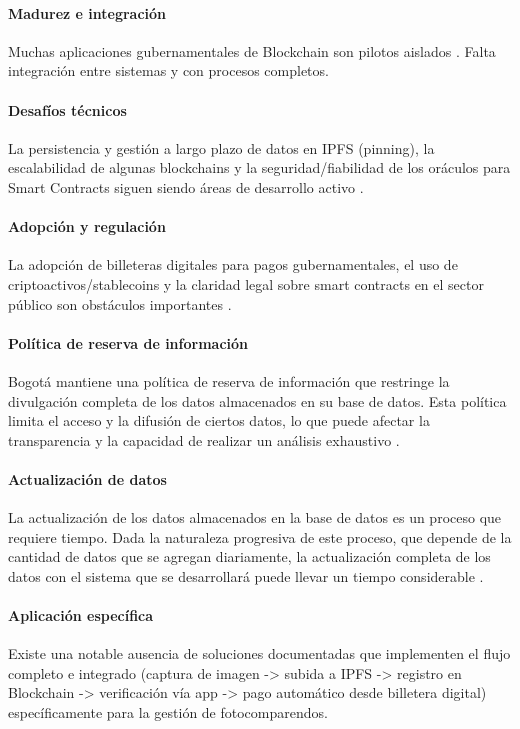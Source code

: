 \paragraph{Madurez e integración}
Muchas aplicaciones gubernamentales de Blockchain son pilotos aislados \parencite{zheng2018blockchain,li2021overview}. Falta integración entre sistemas y con procesos completos. 

\paragraph{Desafíos técnicos}
La persistencia y gestión a largo plazo de datos en IPFS (pinning), la escalabilidad de algunas blockchains y la seguridad/fiabilidad de los oráculos para Smart Contracts siguen siendo áreas de desarrollo activo \parencite{zheng2018blockchain}. 

\paragraph{Adopción y regulación}
La adopción de billeteras digitales para pagos gubernamentales, el uso de criptoactivos/stablecoins y la claridad legal sobre smart contracts en el sector público son obstáculos importantes \parencite{tan2022blockchain}.

\paragraph{Política de reserva de información}
 Bogotá mantiene una política de reserva de información que restringe la divulgación completa de los datos almacenados en su base de datos. Esta política limita el acceso y la difusión de ciertos datos, lo que puede afectar la transparencia y la capacidad de realizar un análisis exhaustivo \parencite{choquevilca2024blockchain}.

\paragraph{Actualización de datos}
La actualización de los datos almacenados en la base de datos es un proceso que requiere tiempo. Dada la naturaleza progresiva de este proceso, que depende de la cantidad de datos que se agregan diariamente, la actualización completa de los datos con el sistema que se desarrollará puede llevar un tiempo considerable \parencite{choquevilca2024blockchain}. 

\paragraph{Aplicación específica}
Existe una notable ausencia de soluciones documentadas que implementen el flujo completo e integrado (captura de imagen -> subida a IPFS -> registro en Blockchain -> verificación vía app -> pago automático desde billetera digital) específicamente para la gestión de fotocomparendos. \parencite{yousfi2022its, chen2024blockchain}


